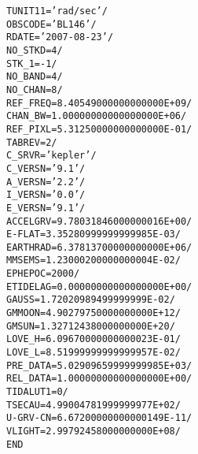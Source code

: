 \documentclass[twoside]{article}
\begin{document}
\begin{alltt}
TUNIT11 = 'rad/sec '           /
OBSCODE = 'BL146   '           /
RDATE   = '2007-08-23'         /
NO_STKD =                    4 /
STK_1   =                   -1 /
NO_BAND =                    4 /
NO_CHAN =                    8 /
REF_FREQ=   8.40549000000000000E+09 /
CHAN_BW =   1.00000000000000000E+06 /
REF_PIXL=   5.31250000000000000E-01 /
TABREV  =                    2 /
C_SRVR  = 'kepler  '           /
C_VERSN = '9.1     '           /
A_VERSN = '2.2     '           /
I_VERSN = '0.0     '           /
E_VERSN = '9.1     '           /
ACCELGRV=   9.78031846000000016E+00 /
E-FLAT  =   3.35280999999999985E-03 /
EARTHRAD=   6.37813700000000000E+06 /
MMSEMS  =   1.23000200000000004E-02 /
EPHEPOC =                 2000 /
ETIDELAG=   0.00000000000000000E+00 /
GAUSS   =   1.72020989499999999E-02 /
GMMOON  =   4.90279750000000000E+12 /
GMSUN   =   1.32712438000000000E+20 /
LOVE_H  =   6.09670000000000023E-01 /
LOVE_L  =   8.51999999999999957E-02 /
PRE_DATA=   5.02909659999999985E+03 /
REL_DATA=   1.00000000000000000E+00 /
TIDALUT1=                    0 /
TSECAU  =   4.99004781999999977E+02 /
U-GRV-CN=   6.67200000000000149E-11 /
VLIGHT  =   2.99792458000000000E+08 /
END
\end{alltt}
\end{document}
